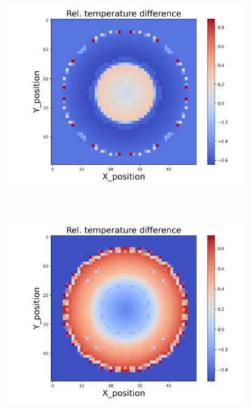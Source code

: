\begin{figure}[h]
\begin{minipage}{\textwidth}
\begin{subfigure}{0.325\textwidth}
            \centering
            \includegraphics[width=\textwidth]{figures/raw_data/31/exp/T_bias.jpg}
        \end{subfigure}
    \end{minipage}\\
    \begin{minipage}{\textwidth}
        \centering
        \begin{subfigure}{0.325\textwidth}
            \centering
            \includegraphics[width=\textwidth]{figures/raw_data/32/exp/T_bias.jpg}
        \end{subfigure}
        \begin{subfigure}{0.325\textwidth}

\end{subfigure}
\end{minipage}
\end{figure}
